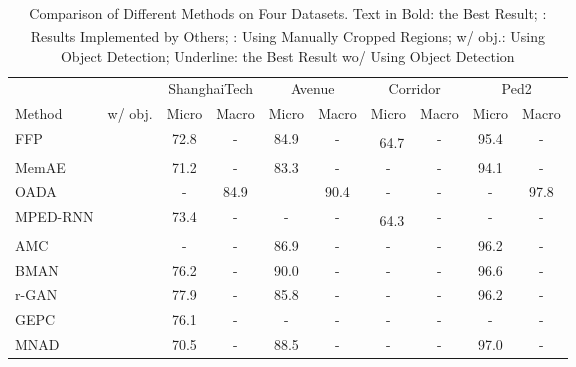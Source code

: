 \documentclass[lettersize,journal]{IEEEtran}
\begin{document}
\newcommand\ts{\textsuperscript}
\newcommand\tdar{\textdagger}
\newcommand\tddr{\textdaggerdbl}
\newcommand\cmk{\checkmark}
\newcommand\tgy{\textcolor[rgb]{0.5,0.5,0.5}}

\begin{table*}[!t]
	\centering
	\caption{Comparison of Different Methods on Four Datasets. Text in Bold: the Best Result; \ts{\tdar}: Results Implemented by Others; \ts{\tddr}: Using Manually Cropped Regions; w/ obj.: Using Object Detection; Underline: the Best Result wo/ Using Object Detection}
	\label{tab:sota}
	\begin{tabular}{@{}lccccccccc@{}}
		\toprule
		&      	& \multicolumn{2}{c}{ShanghaiTech} 		& \multicolumn{2}{c}{Avenue}& \multicolumn{2}{c}{Corridor} 	& \multicolumn{2}{c}{Ped2} \\\cmidrule(l){3-10} 
		Method     											&w/ obj.& Micro           	& Macro          	& Micro		& Macro       	& Micro         & Macro        	& Micro     & Macro      \\ \midrule
		FFP\cite{FutureFrame2018liua}  						&    	& 72.8            	& -              	& 84.9		& -				&~64.7\ts{\tdar}& - 		& 95.4 		& -   \\
MemAE\cite{MemorizingNormality2019gonga}			&    	& 71.2            	& -              	& 83.3      & -				& -				& -            	& 94.1		& -          \\
		OADA\cite{ObjectCentricAutoEncoders2019ionescua}	& \cmk  & -		        	& 84.9       		& 			& 90.4			& -				& -      		& -			& 97.8 \\
		MPED-RNN\cite{LearningRegularity2019moraisa}		&    	& 73.4            	& -              	& -			& -				&~64.3\ts{\tdar}& - 			& -			& -          \\
		AMC\cite{AnomalyDetection2019nguyena}				&    	& -	            	& -              	& 86.9		& -				& -				& -            	& 96.2		& -          \\
		BMAN\cite{BMANBidirectional2020lee}					&    	& 76.2            	& -              	& 90.0		& -				& -				& -            	& 96.6		& -          \\
		r-GAN\cite{FewShotSceneAdaptive2020lua}				&    	& 77.9            	& -              	& 85.8		& -				& -				& -            	& 96.2		& -          \\
		GEPC\cite{GraphEmbedded2020markovitza}				&    	& 76.1            	& -              	& -			& -				& -				& -            	& -			& -          \\
		MNAD\cite{LearningMemoryGuided2020parka}			&    	& 70.5            	& -              	& 88.5		& -				& -				& -            	& 97.0		& -          \\

\end{tabular}
\end{table*}
\end{document}
